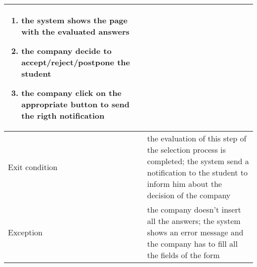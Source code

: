 \begin{table} [H]
\begin{tabular}{|| P{7.5cm} | P{7.5cm} ||}
{\begin{enumerate}
								\item the system shows the page with the evaluated answers
								\item the company decide to accept/reject/postpone the student
								\item the company click on the appropriate button to send the rigth notification
						\end{enumerate}} \\
						\hline 
						Exit condition & the evaluation of this step of the selection process is completed; the system send a notification to the student to inform him about the decision of the company   \\
						\hline
						Exception & the company doesn't insert all the answers; the system shows an error message and the company has to fill all the fields of the form \\
						\hline
					\end{tabular}
				\end{table}
				
